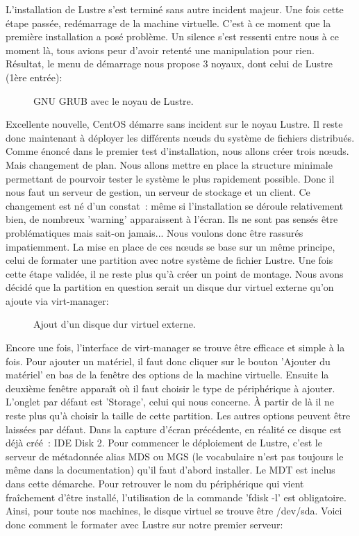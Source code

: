 \documentclass[12pt]{article}
\begin{document}
L'installation de Lustre s'est terminé sans autre incident majeur. Une fois cette étape passée, redémarrage de la machine virtuelle. C'est à ce moment que la première installation a posé problème. Un silence s'est ressenti entre nous à ce moment là, tous avions peur d'avoir retenté une manipulation pour rien. Résultat, le menu de démarrage nous propose 3 noyaux, dont celui de Lustre (1ère entrée):

\begin{figure}[H]
\caption{GNU GRUB avec le noyau de Lustre.}
\label{fig:identification}
\end{figure}

Excellente nouvelle, CentOS démarre sans incident sur le noyau Lustre. Il reste donc maintenant à déployer les différents nœuds du système de fichiers distribués. Comme énoncé dans le premier test d'installation, nous allons créer trois nœuds. Mais changement de plan. Nous allons mettre en place la structure minimale permettant de pourvoir tester le système le plus rapidement possible. Donc il nous faut un serveur de gestion, un serveur de stockage et un client. Ce changement est né d'un constat : même si l'installation se déroule relativement bien, de nombreux 'warning' apparaissent à l'écran. Ils ne sont pas sensés être problématiques mais sait-on jamais... Nous voulons donc être rassurés impatiemment. La mise en place de ces nœuds se base sur un même principe, celui de formater une partition avec notre système de fichier Lustre. Une fois cette étape validée, il ne reste plus qu'à créer un point de montage. Nous avons décidé que la partition en question serait un disque dur virtuel externe qu'on ajoute via virt-manager:

\begin{figure}[H]
\caption{Ajout d'un disque dur virtuel externe.}
\label{fig:identification}
\end{figure}

Encore une fois, l'interface de virt-manager se trouve être efficace et simple à la fois. Pour ajouter un matériel, il faut donc cliquer sur le bouton 'Ajouter du matériel' en bas de la fenêtre des options de la machine virtuelle. Ensuite la deuxième fenêtre apparaît où il faut choisir le type de périphérique à ajouter. L'onglet par défaut est 'Storage', celui qui nous concerne. À partir de là il ne reste plus qu'à choisir la taille de cette partition. Les autres options peuvent être laissées par défaut. Dans la capture d'écran précédente, en réalité ce disque est déjà créé : IDE Disk 2. Pour commencer le déploiement de Lustre, c'est le serveur de métadonnée alias MDS ou MGS (le vocabulaire n'est pas toujours le même dans la documentation) qu'il faut d'abord installer. Le MDT est inclus dans cette démarche. Pour retrouver le nom du périphérique qui vient fraîchement d'être installé, l'utilisation de la commande 'fdisk -l' est obligatoire. Ainsi, pour toute nos machines, le disque virtuel se trouve être /dev/sda. Voici donc comment le formater avec Lustre sur notre premier serveur:
\end{document}
